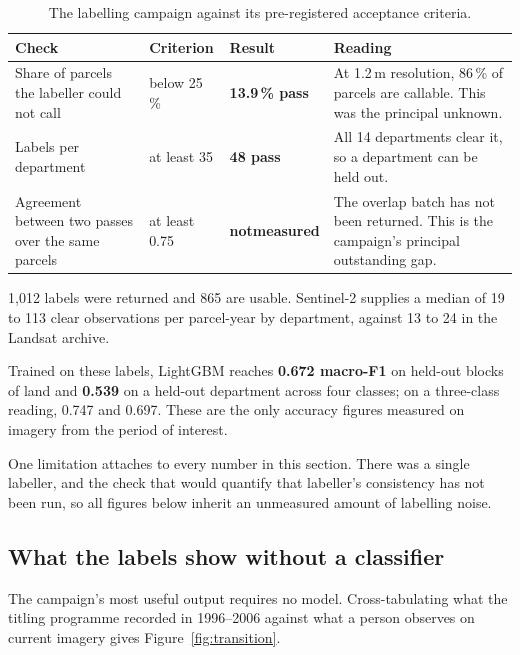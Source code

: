 \documentclass[11pt,a4paper]{article}
\begin{document}
\begin{table}[htbp]
\centering
\small
\caption{The labelling campaign against its pre-registered acceptance criteria.}
\label{tab:gates}
\begin{tabular}{@{}p{4.6cm}p{3.0cm}p{2.3cm}p{5.0cm}@{}}
\toprule
\textbf{Check} & \textbf{Criterion} & \textbf{Result} & \textbf{Reading} \\
\midrule
Share of parcels the labeller could not call
& below 25\,\%
& \textbf{13.9\,\% pass}
& At 1.2\,m resolution, 86\,\% of parcels are callable. This was the principal unknown. \\[0.4em]

Labels per department
& at least 35
& \textbf{48 pass}
& All 14 departments clear it, so a department can be held out. \\[0.4em]

Agreement between two passes over the same parcels
& at least 0.75
& \textbf{not}\newline\textbf{measured}
& The overlap batch has not been returned. This is the campaign's principal outstanding gap. \\
\bottomrule
\end{tabular}
\end{table}

1{,}012 labels were returned and 865 are usable. Sentinel-2 supplies a median of 19 to 113 clear
observations per parcel-year by department, against 13 to 24 in the Landsat archive.

Trained on these labels, LightGBM reaches \textbf{0.672 macro-F1} on held-out blocks of land and
\textbf{0.539} on a held-out department across four classes; on a three-class reading, 0.747 and
0.697. These are the only accuracy figures measured on imagery from the period of interest.

One limitation attaches to every number in this section. There was a single labeller, and the
check that would quantify that labeller's consistency has not been run, so all figures below
inherit an unmeasured amount of labelling noise.

\subsection{What the labels show without a classifier}

The campaign's most useful output requires no model. Cross-tabulating what the titling programme
recorded in 1996--2006 against what a person observes on current imagery gives
Figure~\ref{fig:transition}.
\end{document}
